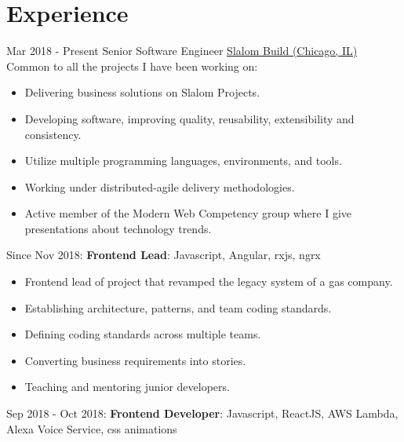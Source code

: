 \documentclass[letterpaper]{template} %
\begin{document}
\makeprofile %


\section{Experience}

\begin{twenty} %
    \twentyitem
    	{Mar 2018 - Present}
		{}
        {Senior Software Engineer}
        {\href{https://www.slalom.com/}{Slalom Build (Chicago, IL)}}
        {Common to all the projects I have been working on:}
        {\begin{itemize}
            \item Delivering business solutions on Slalom Projects.
            \item Developing software, improving quality, reusability, extensibility and consistency.
            \item Utilize multiple programming languages, environments, and tools.
            \item Working under distributed-agile delivery methodologies.
            \item Active member of the Modern Web Competency group where I give presentations about technology trends.
        \end{itemize}}
    \twentyitem
        {}
        {}
        {}
        {}
        {Since Nov 2018: \textbf{Frontend Lead}: Javascript, Angular, rxjs, ngrx}
        {\begin{itemize}
            \item Frontend lead of project that revamped the legacy system of a gas company.
            \item Establishing architecture, patterns, and team coding standards.
            \item Defining coding standards across multiple teams.
            \item Converting business requirements into stories.
            \item Teaching and mentoring junior developers.
        \end{itemize}}
    \twentyitem
    	{}
		{}
        {}
        {}
        {Sep 2018 - Oct 2018: \textbf{Frontend Developer}: Javascript, ReactJS, AWS Lambda, Alexa Voice Service, css animations}

\end{twenty}
\end{document}

